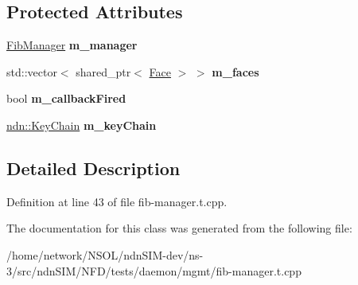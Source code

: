 \subsection*{Protected Attributes}
\begin{DoxyCompactItemize}
\item 
\hyperlink{classnfd_1_1FibManager}{Fib\+Manager} {\bfseries m\+\_\+manager}\hypertarget{classnfd_1_1tests_1_1FibManagerFixture_a1cb8bcee49cea7c918a2f59ef22e177d}{}\label{classnfd_1_1tests_1_1FibManagerFixture_a1cb8bcee49cea7c918a2f59ef22e177d}

\item 
std\+::vector$<$ shared\+\_\+ptr$<$ \hyperlink{classnfd_1_1Face}{Face} $>$ $>$ {\bfseries m\+\_\+faces}\hypertarget{classnfd_1_1tests_1_1FibManagerFixture_a961dfe3852d7a5c26c1c3aba1a2ec691}{}\label{classnfd_1_1tests_1_1FibManagerFixture_a961dfe3852d7a5c26c1c3aba1a2ec691}

\item 
bool {\bfseries m\+\_\+callback\+Fired}\hypertarget{classnfd_1_1tests_1_1FibManagerFixture_a797de20ff7fcde38c270d948dc2c204a}{}\label{classnfd_1_1tests_1_1FibManagerFixture_a797de20ff7fcde38c270d948dc2c204a}

\item 
\hyperlink{classndn_1_1security_1_1KeyChain}{ndn\+::\+Key\+Chain} {\bfseries m\+\_\+key\+Chain}\hypertarget{classnfd_1_1tests_1_1FibManagerFixture_ac8b690091348b92465457e79d0361e38}{}\label{classnfd_1_1tests_1_1FibManagerFixture_ac8b690091348b92465457e79d0361e38}

\end{DoxyCompactItemize}


\subsection{Detailed Description}


Definition at line 43 of file fib-\/manager.\+t.\+cpp.



The documentation for this class was generated from the following file\+:\begin{DoxyCompactItemize}
\item 
/home/network/\+N\+S\+O\+L/ndn\+S\+I\+M-\/dev/ns-\/3/src/ndn\+S\+I\+M/\+N\+F\+D/tests/daemon/mgmt/fib-\/manager.\+t.\+cpp\end{DoxyCompactItemize}
